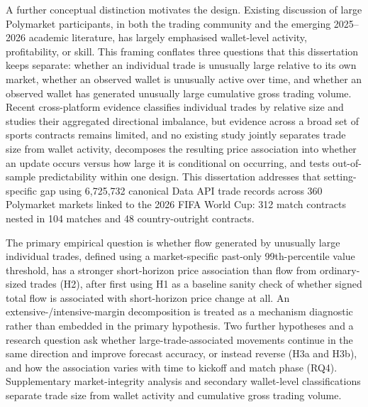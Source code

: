 A further conceptual distinction motivates the design. Existing discussion of large Polymarket participants, in both the trading community and the emerging 2025--2026 academic literature, has largely emphasised wallet-level activity, profitability, or skill. This framing conflates three questions that this dissertation keeps separate: whether an individual trade is unusually large relative to its own market, whether an observed wallet is unusually active over time, and whether an observed wallet has generated unusually large cumulative gross trading volume. Recent cross-platform evidence classifies individual trades by relative size and studies their aggregated directional imbalance, but evidence across a broad set of sports contracts remains limited, and no existing study jointly separates trade size from wallet activity, decomposes the resulting price association into whether an update occurs versus how large it is conditional on occurring, and tests out-of-sample predictability within one design. This dissertation addresses that setting-specific gap using 6,725,732 canonical Data API trade records across 360 Polymarket markets linked to the 2026 FIFA World Cup: 312 match contracts nested in 104 matches and 48 country-outright contracts.

The primary empirical question is whether flow generated by unusually large individual trades, defined using a market-specific past-only 99th-percentile value threshold, has a stronger short-horizon price association than flow from ordinary-sized trades (H2), after first using H1 as a baseline sanity check of whether signed total flow is associated with short-horizon price change at all. An extensive-/intensive-margin decomposition is treated as a mechanism diagnostic rather than embedded in the primary hypothesis. Two further hypotheses and a research question ask whether large-trade-associated movements continue in the same direction and improve forecast accuracy, or instead reverse (H3a and H3b), and how the association varies with time to kickoff and match phase (RQ4). Supplementary market-integrity analysis and secondary wallet-level classifications separate trade size from wallet activity and cumulative gross trading volume.

